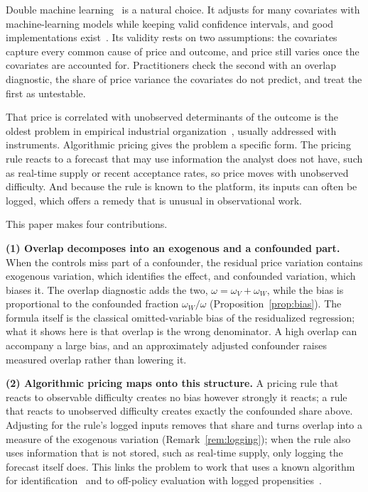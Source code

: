 \documentclass[11pt]{article}
\theoremstyle{remark}
\begin{document}
Double machine learning~\citep{chernozhukov2018} is a natural choice. It adjusts for many covariates with machine-learning models while keeping valid confidence intervals, and good implementations exist~\citep{bach2022}. Its validity rests on two assumptions: the covariates capture every common cause of price and outcome, and price still varies once the covariates are accounted for. Practitioners check the second with an overlap diagnostic, the share of price variance the covariates do not predict, and treat the first as untestable.

That price is correlated with unobserved determinants of the outcome is the oldest problem in empirical industrial organization~\citep{berry1994, blp1995}, usually addressed with instruments. Algorithmic pricing gives the problem a specific form. The pricing rule reacts to a forecast that may use information the analyst does not have, such as real-time supply or recent acceptance rates, so price moves with unobserved difficulty. And because the rule is known to the platform, its inputs can often be logged, which offers a remedy that is unusual in observational work.

This paper makes four contributions.

\textbf{(1) Overlap decomposes into an exogenous and a confounded part.} When the controls miss part of a confounder, the residual price variation contains exogenous variation, which identifies the effect, and confounded variation, which biases it. The overlap diagnostic adds the two, $\omega = \omega_V + \omega_W$, while the bias is proportional to the confounded fraction $\omega_W / \omega$ (Proposition~\ref{prop:bias}). The formula itself is the classical omitted-variable bias of the residualized regression; what it shows here is that overlap is the wrong denominator. A high overlap can accompany a large bias, and an approximately adjusted confounder raises measured overlap rather than lowering it.

\textbf{(2) Algorithmic pricing maps onto this structure.} A pricing rule that reacts to observable difficulty creates no bias however strongly it reacts; a rule that reacts to unobserved difficulty creates exactly the confounded share above. Adjusting for the rule's logged inputs removes that share and turns overlap into a measure of the exogenous variation (Remark~\ref{rem:logging}); when the rule also uses information that is not stored, such as real-time supply, only logging the forecast itself does. This links the problem to work that uses a known algorithm for identification~\citep{narita2021} and to off-policy evaluation with logged propensities~\citep{bottou2013, dudik2011}.
\end{document}
